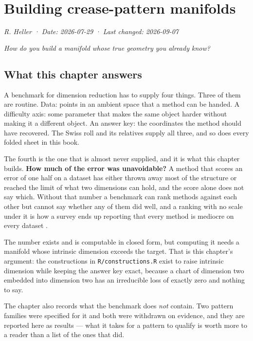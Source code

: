 \documentclass[
  british,
  a4paper,
]{book}
\begin{document}
\chapter{Building crease-pattern manifolds}\label{benchmarks}

\emph{R. Heller · Date: 2026-07-29 · Last changed: 2026-09-07}

\emph{How do you build a manifold whose true geometry you already know?}

\section{What this chapter answers}\label{bench-question}

A benchmark for dimension reduction has to supply four things. Three of them are
routine. Data: points in an ambient space that a method can be handed. A
difficulty axis: some parameter that makes the same object harder without making
it a different object. An answer key: the coordinates the method should have
recovered. The Swiss roll and its relatives supply all three, and so does every
folded sheet in this book.

The fourth is the one that is almost never supplied, and it is what this chapter
builds. \textbf{How much of the error was unavoidable?} A method that scores an error
of one half on a dataset has either thrown away most of the structure or reached
the limit of what two dimensions can hold, and the score alone does not say
which. Without that number a benchmark can rank methods against each other but
cannot say whether any of them did well, and a ranking with no scale under it is
how a survey ends up reporting that every method is mediocre on every dataset
\citep{espadoto2021survey}.

The number exists and is computable in closed form, but computing it needs a
manifold whose intrinsic dimension exceeds the target. That is this chapter's
argument: the constructions in \texttt{R/constructions.R} exist to raise intrinsic
dimension while keeping the answer key exact, because a chart of dimension two
embedded into dimension two has an irreducible loss of exactly zero and nothing
to say.

The chapter also records what the benchmark does \emph{not} contain. Two pattern
families were specified for it and both were withdrawn on evidence, and they are
reported here as results --- what it takes for a pattern to qualify is worth more
to a reader than a list of the ones that did.
\end{document}
